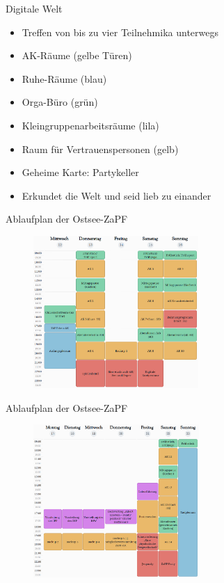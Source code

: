 \documentclass[compress, aspectratio=169]{beamer}
\begin{document}
\begin{frame}{Digitale Welt}
\begin{itemize}
    \item Treffen von bis zu vier Teilnehmika unterwegs
    \item AK-Räume (gelbe Türen)
    \item Ruhe-Räume (blau)
    \item Orga-Büro (grün)
    \item Kleingruppenarbeitsräume (lila)
    \item Raum für Vertrauenspersonen (gelb)
    \item Geheime Karte: Partykeller
    \item Erkundet die Welt und seid lieb zu einander
\end{itemize}

\end{frame}
	\begin{frame}{Ablaufplan der Ostsee-ZaPF}
		\begin{figure}
			\centering
			\includegraphics[height=5.8cm]{Woche1.png}
		\end{figure}
	\end{frame}
	
	\begin{frame}{Ablaufplan der Ostsee-ZaPF}
		\begin{figure}
			\centering
			\includegraphics[height=5.8cm]{Woche2.png}
		\end{figure}
	\end{frame}
\end{document}
